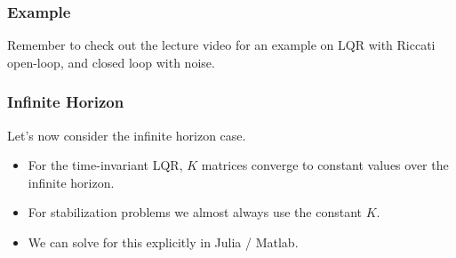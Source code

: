 \subsubsection{Example}
Remember to check out the lecture video for an example on LQR with Riccati open-loop, and closed loop with noise.

\subsubsection{Infinite Horizon}
Let's now consider the infinite horizon case.
\begin{itemize}
    \item For the time-invariant LQR, $K$ matrices converge to constant values over the infinite horizon.
    \item For stabilization problems we almost always use the constant $K$.
    \item We can solve for this explicitly in Julia / Matlab.
\end{itemize}

